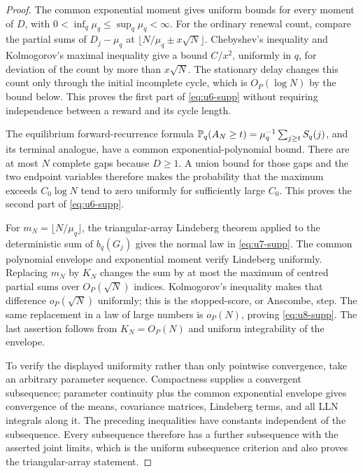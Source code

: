 \begin{proof}
The common exponential moment gives uniform bounds for every moment of
\(D\), with \(0<\inf_q\mu_q\le\sup_q\mu_q<\infty\).  For the ordinary
renewal count, compare the partial sums of \(D_j-\mu_q\) at
\(\lfloor N/\mu_q\pm x\sqrt N\rfloor\).  Chebyshev's inequality and
Kolmogorov's maximal inequality give a bound \(C/x^2\), uniformly in \(q\),
for deviation of the count by more than \(x\sqrt N\).  The stationary delay
changes this count only through the initial incomplete cycle, which is
\(O_P(\log N)\) by the bound below.  This proves the first part of
\eqref{eq:u6-supp} without requiring independence between a reward and its cycle
length.

The equilibrium forward-recurrence formula
\(\mathbb P_q(A_N\ge t)=\mu_q^{-1}\sum_{j\ge t}S_q(j)\), and its terminal analogue,
have a common exponential-polynomial bound.  There are at most \(N\) complete
gaps because \(D\ge1\).  A union bound for those gaps and the two endpoint
variables therefore makes the probability that the maximum exceeds
\(C_0\log N\) tend to zero uniformly for sufficiently large \(C_0\).  This
proves the second part of \eqref{eq:u6-supp}.

For \(m_N=\lfloor N/\mu_q\rfloor\), the triangular-array Lindeberg theorem
applied to the deterministic sum of \(b_q(G_j)\) gives the normal law in
\eqref{eq:u7-supp}.  The common polynomial envelope and exponential moment verify
Lindeberg uniformly.  Replacing \(m_N\) by \(K_N\) changes the sum by at most
the maximum of centred partial sums over \(O_P(\sqrt N)\) indices.
Kolmogorov's inequality makes that difference \(o_P(\sqrt N)\) uniformly;
this is the stopped-score, or Anscombe, step.  The same replacement in a
law of large numbers is \(o_P(N)\), proving \eqref{eq:u8-supp}.  The last assertion
follows from \(K_N=O_P(N)\) and uniform integrability of the envelope.

To verify the displayed uniformity rather than only pointwise convergence,
take an arbitrary parameter sequence.  Compactness supplies a convergent
subsequence; parameter continuity plus the common exponential envelope gives
convergence of the means, covariance matrices, Lindeberg terms, and all LLN
integrals along it.  The preceding inequalities have constants independent of
the subsequence.  Every subsequence therefore has a further subsequence with
the asserted joint limits, which is the uniform subsequence criterion and
also proves the triangular-array statement.
\end{proof}

